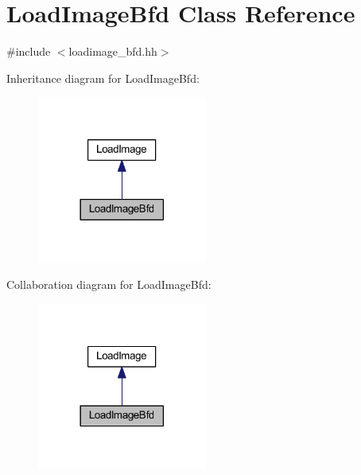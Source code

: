 \hypertarget{class_load_image_bfd}{}\section{Load\+Image\+Bfd Class Reference}
\label{class_load_image_bfd}


{\ttfamily \#include $<$loadimage\+\_\+bfd.\+hh$>$}



Inheritance diagram for Load\+Image\+Bfd\+:
\nopagebreak
\begin{figure}[H]
\begin{center}
\leavevmode
\includegraphics[width=158pt]{class_load_image_bfd__inherit__graph}
\end{center}
\end{figure}


Collaboration diagram for Load\+Image\+Bfd\+:
\nopagebreak
\begin{figure}[H]
\begin{center}
\leavevmode
\includegraphics[width=158pt]{class_load_image_bfd__coll__graph}
\end{center}
\end{figure}
